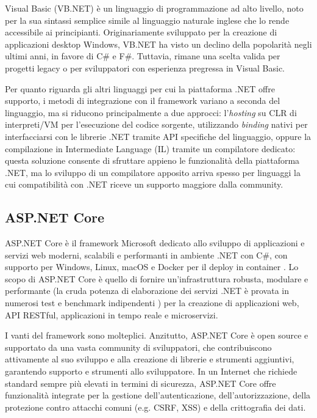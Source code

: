 Visual Basic (VB.NET) è un linguaggio di programmazione ad alto livello, noto per la sua sintassi semplice simile al linguaggio naturale inglese che lo rende accessibile ai principianti. Originariamente sviluppato per la creazione di applicazioni desktop Windows, VB.NET ha visto un declino della popolarità negli ultimi anni, in favore di C\# e F\#. Tuttavia, rimane una scelta valida per progetti legacy o per sviluppatori con esperienza pregressa in Visual Basic.

Per quanto riguarda gli altri linguaggi per cui la piattaforma .NET offre supporto, i metodi di integrazione con il framework variano a seconda del linguaggio, ma si riducono principalmente a due approcci: l'\emph{hosting} su CLR di interpreti/VM per l'esecuzione del codice sorgente, utilizzando \emph{binding} nativi per interfacciarsi con le librerie .NET tramite API specifiche del linguaggio, oppure la compilazione in Intermediate Language (IL) tramite un compilatore dedicato: questa soluzione consente di sfruttare appieno le funzionalità della piattaforma .NET, ma lo sviluppo di un compilatore apposito arriva spesso per linguaggi la cui compatibilità con .NET riceve un supporto maggiore dalla community.

\subsection{ASP.NET Core}
ASP.NET Core è il framework Microsoft dedicato allo sviluppo di applicazioni e servizi web moderni, scalabili e performanti in ambiente .NET con C\#, con supporto per Windows, Linux, macOS e Docker per il deploy in container \cite{aspdotnet_site}.
Lo scopo di ASP.NET Core è quello di fornire un'infrastruttura robusta, modulare e performante (la cruda potenza di elaborazione dei servizi .NET è provata in numerosi test e benchmark indipendenti \cite{benchmark}) per la creazione di applicazioni web, API RESTful, applicazioni in tempo reale e microservizi.

I vanti del framework sono molteplici. Anzitutto, ASP.NET Core è open source e supportato da una vasta community di sviluppatori, che contribuiscono attivamente al suo sviluppo e alla creazione di librerie e strumenti aggiuntivi, garantendo supporto e strumenti allo sviluppatore.
In un Internet che richiede standard sempre più elevati in termini di sicurezza, ASP.NET Core offre funzionalità integrate per la gestione dell'autenticazione, dell'autorizzazione, della protezione contro attacchi comuni (e.g. CSRF, XSS) e della crittografia dei dati.

